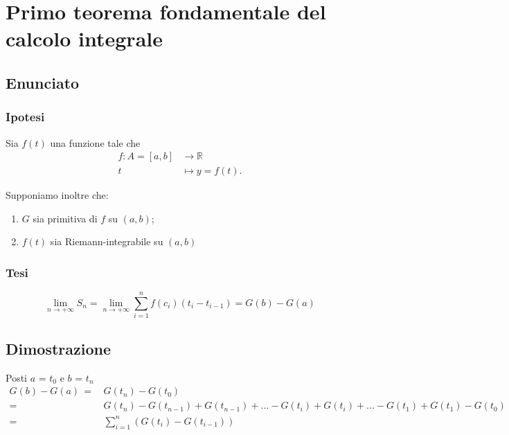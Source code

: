 \documentclass[../../analisi1]{subfiles}
\begin{document}
    \chapter{Primo teorema fondamentale del calcolo integrale}
    \label{teoFondCalcoloIntegrale1}

        \section*{Enunciato}

            \subsection*{Ipotesi}

                Sia \(f(t)\) una funzione tale che
                \begin{align*}
                    f : A = [a, b] &\longrightarrow \mathbb{R}\\
                    t &\longmapsto y = f(t).
                \end{align*}

                Supponiamo inoltre che:

                \begin{enumerate}
                    \indentitem \item \(G\) sia primitiva di \(f\) su \((a, b)\);
                    \indentitem \item \(f(t)\) sia Riemann-integrabile su \((a, b)\)
                \end{enumerate}

            \subsection*{Tesi}

                \[\lim_{n\to +\infty} {S_n} = \lim_{n\to +\infty} {\sum_{i=1}^{n} f(c_i)({t_i} - t_{i-1})} = G(b) - G(a) \]

        \section*{Dimostrazione}

                Posti \(a\) = \(t_0\) e \(b\) = \(t_n\)
                \begin{align*}
                    G(b) - G(a) \, =& \, G(t_n) - G(t_0) \\
                    =& \, G(t_n) - G(t_{n-1}) + G(t_{n-1}) + ... - G(t_i) + G(t_i) + ... - G(t_1) + G(t_1) - G(t_0) \\
                    =& \, \sum_{i=1}^n (G(t_i) - G(t_{i-1}))
                \end{align*}
\end{document}

